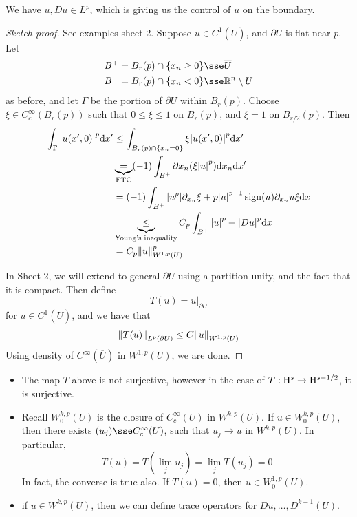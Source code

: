 \documentclass{article}
\begin{document}
\begin{remark}
    We have \(u, Du \in L^p\), which is giving us the control of \(u\) on the boundary.
\end{remark}

\begin{proof}
    [Sketch proof] See examples sheet 2. Suppose \(u \in C^1(\overline U)\), and \(\partial U\) is flat near \(p\). Let
    \begin{align*}
        B^+ &= B_r(p) \cap \{x_n \ge 0\} \sse \overline U \\
        B^- &= B_r(p) \cap \{x_n < 0\} \sse \R^n \setminus U
    \end{align*}
    as before, and let \(\Gamma\) be the portion of \(\partial U\) within \(B_r(p)\). Choose \(\xi \in C_c^\infty(B_r(p))\) such that \(0 \le \xi \le 1\) on \(B_r(p)\), and \(\xi = 1\) on \(B_{r/2}(p)\). Then
    \begin{align*}
        \int_\Gamma \abs{u(x', 0)}^p \dd x' &\le \int_{B_r(p) \cap \{x_n = 0\}} \xi \abs{u(x', 0)}^p \dd x' \\
        &\underbrace{=}_{\text{FTC}} (-1)\int_{B^+}\partial x_n(\xi\abs{u}^p)\dd x_n \dd x' \\
        &= (-1)\int_{B^+}\abs{u^p}\partial_{x_n}\xi + p \abs{u}^{p-1}\operatorname{sign}(u)\partial_{x_n}u \xi \dd x \\
        &\underbrace{\le}_{\text{Young's inequality}} C_p\int_{B^+}\abs{u}^p + \abs{Du}^p \dd x \\
        &= C_p\norm{u}^p_{W^{1, p}(U)}
    \end{align*}

    In Sheet 2, we will extend to general \(\partial U\) using a partition unity, and the fact that it is compact. Then define
    \[T(u) = u\vert_{\partial U}\]
    for \(u \in C^1(\overline U)\), and we have that
    \[\norm{T(u)}_{L^p(\partial U)} \le C\norm{u}_{W^{1, p}(U)}\]
    Using density of \(C^\infty(\overline U)\) in \(W^{1, p}(U)\), we are done.
\end{proof}

\begin{remark}
    \begin{itemize}
        \item The map \(T\) above is not surjective, however in the case of \(T : \mathrm{H}^s \to \mathrm{H}^{s-1/2}\), it is surjective.
        \item Recall \(W^{k,p}_0(U)\) is the closure of \(C_c^\infty(U)\) in \(W^{k, p}(U)\). If \(u \in W^{k,p}_0(U)\), then there exists \((u_j) \sse C_c^\infty(U)\), such that \(u_j \to u\) in \(W^{k, p}(U)\). In particular,
        \[T(u) = T(\lim_j u_j) = \lim_j T(u_j) = 0\]
        In fact, the converse is true also. If \(T(u) = 0\), then \(u \in W^{1, p}_0(U)\).
        \item if \(u \in W^{k, p}(U)\), then we can define trace operators for \(Du, \dots, D^{k-1}(U)\).
    \end{itemize}
\end{remark}
\end{document}
